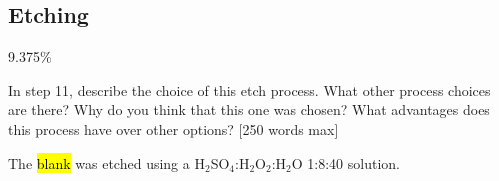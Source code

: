 \subsection{Etching}
\label{sec:fab:etching}

9.375\%

In step 11, describe the choice of this etch process. What other process choices are there? Why do you think that this one was chosen? What advantages does this process have over other options? [250 words max]

The \hl{blank} was etched using a H$_{2}$SO$_{4}$:H$_{2}$O$_{2}$:H$_{2}$O 1:8:40 solution.
